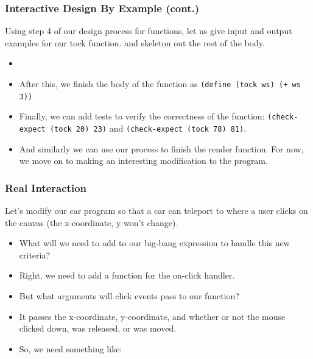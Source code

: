 \documentclass{beamer}
\begin{document}

\begin{frame}
  \frametitle{Interactive Design By Example (cont.)}
  Using step 4 of our design process for functions, let us give input
  and output examples for our tock function. and skeleton out the rest of the body.
  \begin{itemize}
  \item<2-> \tockSkeleton
  \item<3-> After this, we finish the body of the function as
    \texttt{(define (tock ws) (+ ws 3))}
  \item<4-> Finally, we can add tests to verify the correctness of the function:
    \texttt{(check-expect (tock 20) 23)} and \texttt{(check-expect (tock 78) 81)}.
  \item<5-> And similarly we can use our process to finish the render function.
    For now, we move on to making an interesting modification to the program.
  \end{itemize}  
\end{frame}


\begin{frame}
  \frametitle{Real Interaction}
  Let's modify our car program so that a car can teleport to where a user clicks
  on the canvas (the x-coordinate, y won't change).
  \begin{itemize}
  \item<2-> What will we need to add to our big-bang expression to handle this
    new criteria?
  \item<3-> Right, we need to add a function for the on-click handler.
  \item<4-> But what arguments will click events pass to our function?
  \item<5-> It passes the x-coordinate, y-coordinate, and whether or not the
    mouse clicked down, was released, or was moved.
  \item<6-> So, we need something like:
    \moveCar
  \end{itemize}
\end{frame}
\end{document}
